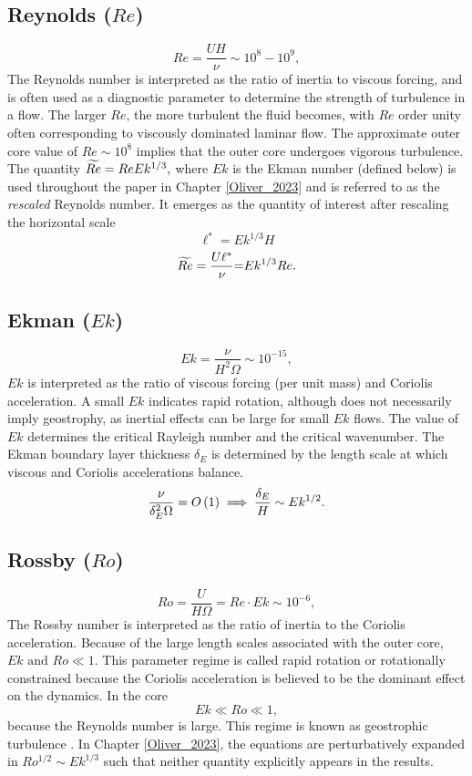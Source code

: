 \subsection*{Reynolds ($Re$)}
\[Re = \frac{UH}{\nu}\sim 10^{8}-10^{9},\]  
The Reynolds number is interpreted as the ratio of inertia to viscous forcing, and is often used as a diagnostic parameter to determine the strength of turbulence in a flow. The larger $Re$, the more turbulent the fluid becomes, with $Re$ order unity often corresponding to viscously dominated laminar flow. 
The approximate outer core value of $Re\sim 10^{8}$ implies that the outer core undergoes vigorous turbulence.
The quantity $\widetilde{Re} = Re Ek^{1/3},$ where $Ek$ is the Ekman number (defined below) is used throughout the paper in Chapter \ref{Oliver_2023} and is referred to as the \textit{rescaled} Reynolds number. It emerges as the quantity of interest after rescaling the horizontal scale
\[\ell^{*} = Ek^{1/3}H\]
\[\widetilde{Re} = \frac{U\ell^{*}}{\nu}\mathcal  = Ek^{1/3}Re.\]
\subsection*{Ekman ($Ek$) }
\[Ek = \frac{\nu}{H^{2}\Omega} \sim 10^{-15},\]
$Ek$ is interpreted as the ratio of viscous forcing (per unit mass) and Coriolis acceleration.
A small $Ek$ indicates rapid rotation, although does not necessarily imply geostrophy, as inertial effects can be large for small $Ek$ flows. 
The value of $Ek$ determines the critical Rayleigh number and the critical wavenumber. The Ekman boundary layer thickness $\delta_{E}$ is determined by the length scale at which viscous and Coriolis accelerations balance.
\[\frac{\nu}{\delta_{E}^{2}\Omega}= O\left ( 1\right )\implies \frac{\delta_{E}}{H} \sim Ek^{1/2}. \]
\subsection*{Rossby ($Ro$)}
\[Ro = \frac{U}{H\Omega}= Re \cdot Ek\sim 10^{-6},\]
The Rossby number is interpreted as the ratio of inertia to the Coriolis acceleration. Because of the large length scales associated with the outer core, $Ek\text{ and } Ro \ll1$. This parameter regime is called rapid rotation or rotationally constrained because the Coriolis acceleration is believed to be the dominant effect on the dynamics.
In the core
\[Ek\ll Ro \ll 1,\]
because the Reynolds number is large. This regime is known as geostrophic turbulence \citep{jC71}.
In Chapter \ref{Oliver_2023}, the equations are perturbatively expanded in $Ro^{1/2}\sim Ek^{1/3}$ such that neither quantity explicitly appears in the results.
